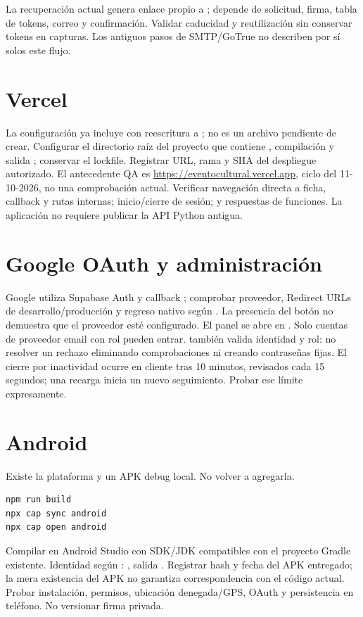 \documentclass[11pt,a4paper]{article}
\begin{document}
La recuperación actual genera enlace propio a
; depende de solicitud, firma, tabla de tokens,
correo y confirmación. Validar caducidad y reutilización sin conservar tokens en capturas.
Los antiguos pasos de SMTP/GoTrue no describen por sí solos este flujo.

\section{Vercel}
La configuración ya incluye  con reescritura a
; no es un archivo pendiente de crear.
Configurar el directorio raíz del proyecto que contiene ,
compilación  y salida ; conservar el lockfile.
Registrar URL, rama y SHA del despliegue autorizado. El antecedente QA es
\url{https://eventocultural.vercel.app}, ciclo del 11-10-2026, no una comprobación actual.
Verificar navegación directa a ficha, callback y rutas internas; inicio/cierre de sesión;
y respuestas de funciones. La aplicación no requiere publicar la API Python antigua.

\section{Google OAuth y administración}
Google utiliza Supabase Auth y callback ; comprobar proveedor,
Redirect URLs de desarrollo/producción y regreso nativo según .
La presencia del botón no demuestra que el proveedor esté configurado.
El panel se abre en . Solo cuentas de proveedor email con rol
 pueden entrar.  también valida identidad y rol:
no resolver un rechazo eliminando comprobaciones ni creando contraseñas fijas.
El cierre por inactividad ocurre en cliente tras 10 minutos, revisados cada 15 segundos;
una recarga inicia un nuevo seguimiento. Probar ese límite expresamente.

\section{Android}
Existe la plataforma  y un APK debug local. No volver a agregarla.
\begin{verbatim}
npm run build
npx cap sync android
npx cap open android
\end{verbatim}
Compilar en Android Studio con SDK/JDK compatibles con el proyecto Gradle existente.
Identidad según : , salida
. Registrar hash y fecha del APK entregado; la mera existencia del APK no
garantiza correspondencia con el código actual. Probar instalación, permisos,
ubicación denegada/GPS, OAuth y persistencia en teléfono. No versionar firma privada.
\end{document}

